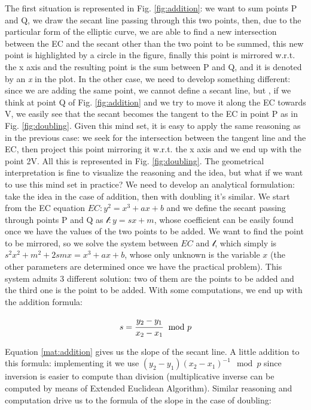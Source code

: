 \documentclass{article}
\begin{document}
The first situation is represented in Fig. \ref{fig:addition}: we want to sum points P and Q, we draw the secant line passing through this two points, then, due to the particular form of the elliptic curve, we are able to find a new intersection between the EC and the secant other than the two point to be summed, this new point is highlighted by a circle in the figure, finally this point is mirrored w.r.t. the x axis and the resulting point is the sum between P and Q, and it is denoted by an \textit{x} in the plot.\newline
In the other case, we need to develop something different: since we are adding the same point, we cannot define a secant line, but , if we think at point Q of Fig. \ref{fig:addition} and we try to move it along the EC towards V, we easily see that the secant becomes the tangent to the EC in point P as in Fig. \ref{fig:doubling}. Given this mind set, it is easy to apply the same reasoning as in the previous case: we seek for the intersection between the tangent line and the EC, then project this point mirroring it w.r.t. the x axis and we end up with the point 2V. All this is represented in Fig. \ref{fig:doubling}. \newline
The geometrical interpretation is fine to visualize the reasoning and the idea, but what if we want to use this mind set in practice? We need to develop an analytical formulation: take the idea in the case of addition, then with doubling it's similar. We start from the EC equation $EC: y^2 = x^3 + ax +b$ and we define the secant passing through points P and Q as $\mathcal{l}: y = sx + m$, whose coefficient can be easily found once we have the values of the two points to be added. We want to find the point to be mirrored, so we solve the system between $EC$ and $\mathcal{l}$, which simply is $s^2x^2 + m^2 + 2smx =  x^3 + ax +b$, whose only unknown is the variable $x$ (the other parameters are determined once we have the practical problem). This system admits 3 different solution: two of them are the points to be added and the third one is the point to be added. With some computations, we end up with the addition formula:

\begin{equation}
	s = \cfrac{y_2 - y_1}{x_2 - x_1} \mod p
	\label{mat:addition}
\end{equation}

Equation \ref{mat:addition} gives us the slope of the secant line. A little addition to this formula: implementing it we use $(y_2 - y_1)(x_2 - x_1)^{-1} \mod p$ since inversion is easier to compute than division (multiplicative inverse can be computed by means of Extended Euclidean Algorithm). Similar reasoning and computation drive us to the formula of the slope in the case of doubling:
\end{document}
